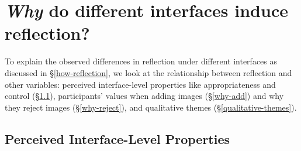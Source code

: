 \section{\textit{Why} do different interfaces induce reflection?}
\label{why-reflection}

To explain the observed differences in reflection under different interfaces as discussed in \S\ref{how-reflection}, we look at the relationship between reflection and other variables: perceived interface-level properties like appropriateness and control (\S\ref{interface-properties}), participants' values when adding images (\S\ref{why-add}) and why they reject images (\S\ref{why-reject}), and qualitative themes (\S\ref{qualitative-themes}).


\subsection{Perceived Interface-Level Properties}
\label{interface-properties}



